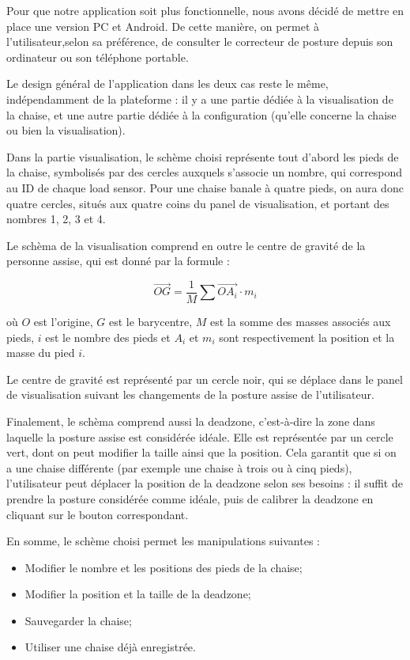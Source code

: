 \documentclass{polytech/polytech}
\begin{document}
Pour que notre application soit plus fonctionnelle, nous avons décidé de mettre en place une version PC et Android. De cette manière, on permet à l'utilisateur,selon sa préférence, de consulter le correcteur de posture depuis son ordinateur ou son téléphone portable.

Le design général de l'application dans les deux cas reste le même, indépendamment de la plateforme : il y a une partie dédiée à la visualisation de la chaise, et une autre partie dédiée à la configuration (qu'elle concerne la chaise ou bien la visualisation). 

Dans la partie visualisation, le schème choisi représente tout d'abord les pieds de la chaise, symbolisés par des cercles auxquels s'associe un nombre, qui correspond au ID de chaque load sensor. Pour une chaise banale à quatre pieds, on aura donc quatre cercles, situés aux quatre coins du panel de visualisation, et portant des nombres 1, 2, 3 et 4. 

Le schèma de la visualisation comprend en outre le centre de gravité de la personne assise, qui est donné par la formule :

$$\vec{OG} = \frac{1}{M} \sum \vec{OA_i} \cdot m_i$$

où $O$ est l'origine, $G$ est le barycentre, $M$ est la somme des masses associés aux pieds, $i$ est le nombre des pieds et $A_i$ et $m_i$ sont respectivement la position et la masse du pied $i$.

Le centre de gravité est représenté par un cercle noir, qui se déplace dans le panel de visualisation suivant les changements de la posture assise de l'utilisateur.

Finalement, le schèma comprend aussi la deadzone, c'est-à-dire la zone dans laquelle la posture assise est considérée idéale. Elle est représentée par un cercle vert, dont on peut modifier la taille ainsi que la position. Cela garantit que si on a une chaise différente (par exemple une chaise à trois ou à cinq pieds), l'utilisateur peut déplacer la position de la deadzone selon ses besoins : il suffit de prendre la posture considérée comme idéale, puis de calibrer la deadzone en cliquant sur le bouton correspondant.

En somme, le schème choisi permet les manipulations suivantes :
\begin{itemize}
\item Modifier le nombre et les positions des pieds de la chaise;
\item Modifier la position et la taille de la deadzone;
\item Sauvegarder la chaise;
\item Utiliser une chaise déjà enregistrée.
\end{itemize}
\end{document}
